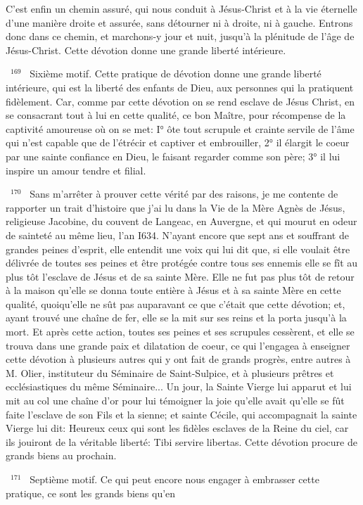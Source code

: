 \documentclass[paper=a5,pagesize=pdftex,fontsize=15pt,headinclude=on,twoside=off]{scrbook}
\newcommand{\negphantom}[1]{\settowidth{\dimen0}{#1}\hspace*{-\dimen0}}
\newcommand{\versenb}[1]{\par \vspace{10pt}~\negphantom{~${}^{#1}$~}${}^{#1}$~}
\begin{document}
C'est enfin un chemin assuré, qui nous conduit à Jésus-Christ et à la vie éternelle d'une manière droite et assurée,
sans détourner ni à droite, ni à gauche. Entrons donc dans ce chemin, et marchons-y jour et nuit, jusqu'à la
plénitude de l'âge de Jésus-Christ.
Cette dévotion donne une grande liberté intérieure.
\versenb{169} Sixième motif. Cette pratique de dévotion donne une grande liberté intérieure, qui est la liberté des enfants
de Dieu, aux personnes qui la pratiquent fidèlement. Car, comme par cette dévotion on se rend esclave de Jésus Christ, en se consacrant tout à lui en cette qualité, ce bon Maître, pour récompense de la captivité amoureuse où
on se met: I° ôte tout scrupule et crainte servile de l'âme qui n'est capable que de l'étrécir et captiver et
embrouiller, 2° il élargit le coeur par une sainte confiance en Dieu, le faisant regarder comme son père; 3° il lui
inspire un amour tendre et filial.
\versenb{170} Sans m'arrêter à prouver cette vérité par des raisons, je me contente de rapporter un trait d'histoire que j'ai lu
dans la Vie de la Mère Agnès de Jésus, religieuse Jacobine, du couvent de Langeac, en Auvergne, et qui mourut
en odeur de sainteté au même lieu, l'an I634. N'ayant encore que sept ans et souffrant de grandes peines d'esprit,
elle entendit une voix qui lui dit que, si elle voulait être délivrée de toutes ses peines et être protégée contre tous
ses ennemis elle se fît au plus tôt l'esclave de Jésus et de sa sainte Mère. Elle ne fut pas plus tôt de retour à la
maison qu'elle se donna toute entière à Jésus et à sa sainte Mère en cette qualité, quoiqu'elle ne sût pas
auparavant ce que c'était que cette dévotion; et, ayant trouvé une chaîne de fer, elle se la mit sur ses reins et la
porta jusqu'à la mort. Et après cette action, toutes ses peines et ses scrupules cessèrent, et elle se trouva dans
une grande paix et dilatation de coeur, ce qui l'engagea à enseigner cette dévotion à plusieurs autres qui y ont fait
de grands progrès, entre autres à M. Olier, instituteur du Séminaire de Saint-Sulpice, et à plusieurs prêtres et
ecclésiastiques du même Séminaire... Un jour, la Sainte Vierge lui apparut et lui mit au col une chaîne d'or pour lui
témoigner la joie qu'elle avait qu'elle se fût faite l'esclave de son Fils et la sienne; et sainte Cécile, qui
accompagnait la sainte Vierge lui dit: Heureux ceux qui sont les fidèles esclaves de la Reine du ciel, car ils jouiront
de la véritable liberté: Tibi servire libertas.
Cette dévotion procure de grands biens au prochain.
\versenb{171} Septième motif. Ce qui peut encore nous engager à embrasser cette pratique, ce sont les grands biens qu'en
\end{document}
